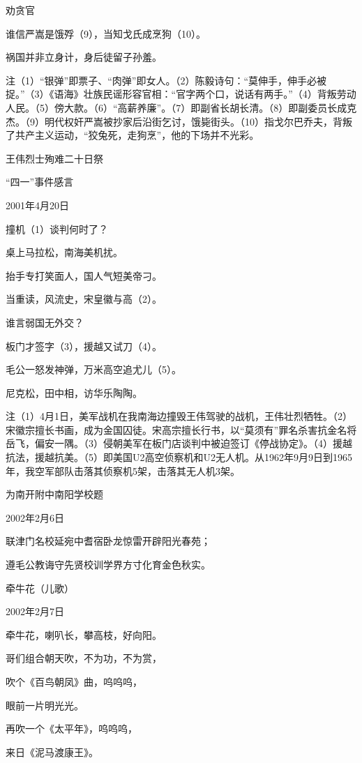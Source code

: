 \documentclass[../../dazhuan.tex]{subfiles}
\begin{document}
劝贪官

谁信严嵩是饿殍（9），当知戈氏成烹狗（10）。

祸国并非立身计，身后徒留子孙羞。

注（1）“银弹”即票子、“肉弹”即女人。（2）陈毅诗句：“莫伸手，伸手必被捉。”（3）《语海》壮族民谣形容官相：“官字两个口，说话有两手。”（4）背叛劳动人民。（5）傍大款。（6）“高薪养廉”。（7）即副省长胡长清。（8）即副委员长成克杰。（9）明代权奸严嵩被抄家后沿街乞讨，饿毙街头。（10）指戈尔巴乔夫，背叛了共产主义运动，“狡兔死，走狗烹”，他的下场并不光彩。



王伟烈士殉难二十日祭

“四一”事件感言

2001年4月20日

撞机（1）谈判何时了？

桌上马拉松，南海美机扰。

抬手专打笑面人，国人气短美帝刁。

当重读，风流史，宋皇徽与高（2）。

谁言弱国无外交？

板门才签字（3），援越又试刀（4）。

毛公一怒发神弹，万米高空追尤儿（5）。

尼克松，田中相，访华乐陶陶。

注（1）4月1日，美军战机在我南海边撞毁王伟驾驶的战机，王伟壮烈牺牲。（2）宋徽宗擅长书画，成为金国囚徒。宋高宗擅长行书，以“莫须有”罪名杀害抗金名将岳飞，偏安一隅。（3）侵朝美军在板门店谈判中被迫签订《停战协定》。（4）援越抗法，援越抗美。（5）即美国U2高空侦察机和U2无人机。从1962年9月9日到1965年，我空军部队击落其侦察机5架，击落其无人机3架。



为南开附中南阳学校题

2002年2月6日

联津门名校延宛中耆宿卧龙惊雷开辟阳光春苑；

遵毛公教诲守先贤校训学界方寸化育金色秋实。



牵牛花（儿歌）

2002年2月7日

牵牛花，喇叭长，攀高枝，好向阳。

哥们组合朝天吹，不为功，不为赏，

吹个《百鸟朝凤》曲，呜呜呜，

眼前一片明光光。

再吹一个《太平年》，呜呜呜，

来日《泥马渡康王》。
\end{document}
